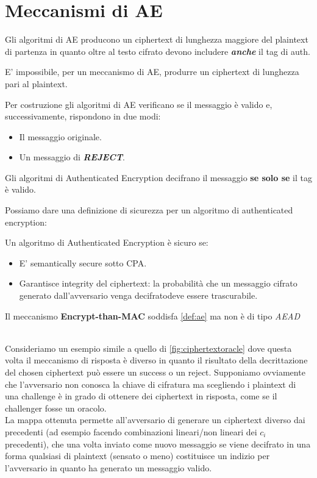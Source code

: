 \section{Meccanismi di AE}
Gli algoritmi di AE producono un ciphertext di lunghezza maggiore del plaintext di partenza in quanto oltre al testo cifrato devono includere \textbf{\textit{anche}} il tag di auth. 
\begin{note}
E' impossibile, per un meccanismo di AE, produrre un ciphertext di lunghezza pari al plaintext.
\end{note}
Per costruzione gli algoritmi di AE verificano se il messaggio è valido e, successivamente, rispondono in due modi:
\begin{itemize}
    \item [\textcolor{green}{\checkmark}] Il messaggio originale.
    \item [\textcolor{red}{\ding{55}}] Un messaggio di \textbf{\textit{REJECT}}.
\end{itemize}
\begin{proposition}
Gli algoritmi di Authenticated Encryption decifrano il messaggio \textbf{se solo se} il tag è valido.
\end{proposition}
Possiamo dare una definizione di sicurezza per un algoritmo di authenticated encryption:
\begin{definition}\label{def:ae}
Un algoritmo di Authenticated Encryption è sicuro se:
\begin{itemize}
    \item E' semantically secure sotto CPA.
    \item Garantisce integrity del ciphertext: la probabilità che un messaggio cifrato generato dall'avversario venga decifrato\footnotemark deve essere trascurabile. 
\end{itemize}
\end{definition}
\begin{note}
Il meccanismo \textbf{Encrypt-than-MAC} soddisfa \cref{def:ae} ma non è di tipo \textit{AEAD}
\end{note}
\begin{example}\hfill\\
Consideriamo un esempio simile a quello di \cref{fig:ciphertextoracle} dove questa volta il meccanismo di risposta è diverso in quanto il risultato della decrittazione del chosen ciphertext può essere un success o un reject. Supponiamo ovviamente che l'avversario non conosca la chiave di cifratura ma scegliendo i plaintext di una challenge è in grado di ottenere dei ciphertext in risposta, come se il challenger fosse un oracolo.\\
La mappa ottenuta permette all'avversario di generare un ciphertext diverso dai precedenti (ad esempio facendo combinazioni lineari/non lineari dei $c_i$ precedenti), che una volta inviato come nuovo messaggio se viene decifrato in una forma qualsiasi di plaintext (sensato o meno) costituisce un indizio per l'avversario in quanto ha generato un messaggio valido.
\end{example}
